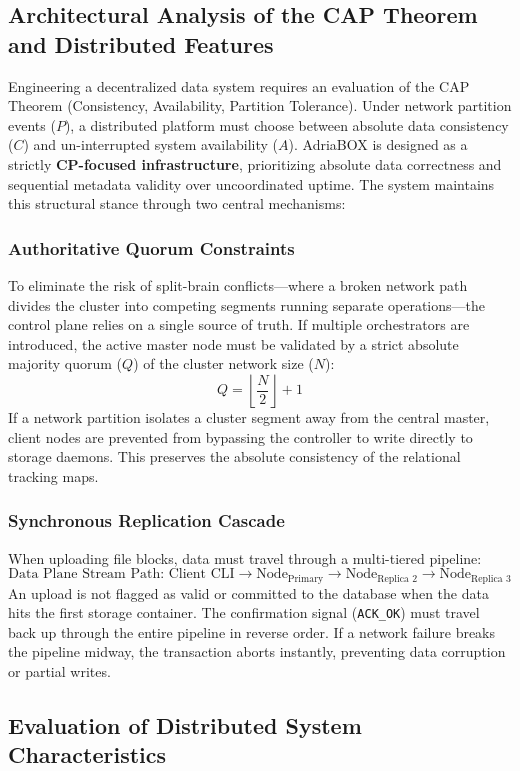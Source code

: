\subsection{Architectural Analysis of the CAP Theorem and Distributed Features}
Engineering a decentralized data system requires an evaluation of the CAP Theorem (Consistency, Availability, Partition Tolerance). Under network partition events ($P$), a distributed platform must choose between absolute data consistency ($C$) and un-interrupted system availability ($A$). AdriaBOX is designed as a strictly \textbf{CP-focused infrastructure}, prioritizing absolute data correctness and sequential metadata validity over uncoordinated uptime. The system maintains this structural stance through two central mechanisms:

\subsubsection{Authoritative Quorum Constraints}
To eliminate the risk of split-brain conflicts—where a broken network path divides the cluster into competing segments running separate operations—the control plane relies on a single source of truth. If multiple orchestrators are introduced, the active master node must be validated by a strict absolute majority quorum ($Q$) of the cluster network size ($N$):
$$Q = \left\lfloor \frac{N}{2} \right\rfloor + 1$$
If a network partition isolates a cluster segment away from the central master, client nodes are prevented from bypassing the controller to write directly to storage daemons. This preserves the absolute consistency of the relational tracking maps.

\subsubsection{Synchronous Replication Cascade}
When uploading file blocks, data must travel through a multi-tiered pipeline:
$$\text{Data Plane Stream Path: } \text{Client CLI} \longrightarrow \text{Node}_{\text{Primary}} \longrightarrow \text{Node}_{\text{Replica 2}} \longrightarrow \text{Node}_{\text{Replica 3}}$$
An upload is not flagged as valid or committed to the database when the data hits the first storage container. The confirmation signal (\texttt{ACK\_OK}) must travel back up through the entire pipeline in reverse order. If a network failure breaks the pipeline midway, the transaction aborts instantly, preventing data corruption or partial writes.

\subsection{Evaluation of Distributed System Characteristics}
